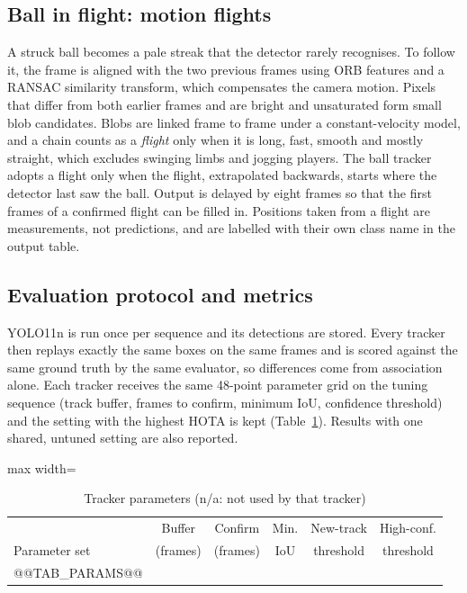 \subsection{Ball in flight: motion flights}
A struck ball becomes a pale streak that the detector rarely recognises. To
follow it, the frame is aligned with the two previous frames using ORB features
and a RANSAC similarity transform, which compensates the camera motion. Pixels
that differ from both earlier frames and are bright and unsaturated form small
blob candidates. Blobs are linked frame to frame under a constant-velocity
model, and a chain counts as a \emph{flight} only when it is long, fast, smooth
and mostly straight, which excludes swinging limbs and jogging players. The
ball tracker adopts a flight only when the flight, extrapolated backwards, starts
where the detector last saw the ball. Output is delayed by eight frames so that
the first frames of a confirmed flight can be filled in. Positions taken from a
flight are measurements, not predictions, and are labelled with their own class
name in the output table.

\subsection{Evaluation protocol and metrics}
YOLO11n is run once per sequence and its detections are stored. Every tracker
then replays exactly the same boxes on the same frames and is scored against
the same ground truth by the same evaluator, so differences come from
association alone. Each tracker receives the same 48-point parameter grid on the
tuning sequence (track buffer, frames to confirm, minimum IoU, confidence
threshold) and the setting with the highest HOTA is kept
(Table~\ref{tab:params}). Results with one shared, untuned setting are also
reported.

\begin{table}[!t]
\caption{Tracker parameters (n/a: not used by that tracker)}
\label{tab:params}
\centering
\footnotesize
\begin{adjustbox}{max width=\columnwidth}
\begin{tabular}{@{}lccccc@{}}
\toprule
 & Buffer & Confirm & Min. & New-track & High-conf. \\
Parameter set & (frames) & (frames) & IoU & threshold & threshold \\
\midrule
@@TAB_PARAMS@@
\bottomrule
\end{tabular}
\end{adjustbox}
\end{table}

